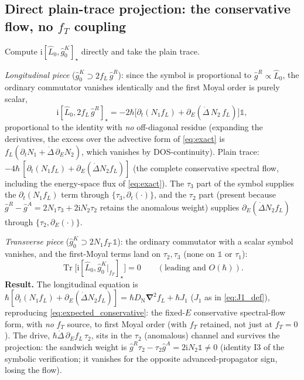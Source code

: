 \documentclass[
  aps,
  prb,
  preprint,
  superscriptaddress,
  longbibliography,
  nofootinbib
]{revtex4-2}
\newcommand{\ii}{\mathrm{i}}
\newcommand{\Tr}{\operatorname{Tr}}
\newcommand{\bnabla}{\boldsymbol{\nabla}}
\newcommand{\DOS}{N_1}
\newcommand{\DN}{D_{\mathrm{N}}}
\newcommand{\fL}{f_L}
\newcommand{\fT}{f_T}
\newcommand{\hatg}{\hat{g}}
\providecommand{\openone}{}\renewcommand{\openone}{\mathds{1}}
\begin{document}
\subsection{Direct plain-trace projection: the conservative flow, no
\texorpdfstring{$\fT$}{fT} coupling}
\label{sec:plain}

Compute $\ii[\hat L_0,\hatg_0^K]_\star$ directly and take the plain trace.

\emph{Longitudinal piece} ($\hatg_0^{K}\!\supset 2\fL\,\hatg^R$): since the
symbol is proportional to $\hatg^R\propto\hat L_0$, the ordinary commutator
vanishes identically and the first Moyal order is purely scalar,
\begin{equation}
  \ii[\hat L_0,2\fL\,\hatg^{R}]_\star
  =-2\hbar\bigl[\partial_t(\DOS\fL)+\partial_E(\dot\Delta\,N_2\,\fL)\bigr]
  \openone ,
  \label{eq:Lpiece}
\end{equation}
proportional to the identity with \emph{no} off-diagonal residue
(expanding the derivatives, the excess over the advective form of
\cref{eq:exact} is $\fL(\partial_t\DOS+\dot\Delta\,\partial_EN_2)$, which
vanishes by DOS-continuity). Plain trace:
$-4\hbar\,[\partial_t(\DOS\fL)+\partial_E(\dot\Delta N_2\fL)]$ (the
complete conservative spectral flow, including the energy-space flux of
\cref{eq:exact}). The $\tau_3$ part of the symbol supplies the
$\partial_t(\DOS\fL)$ term through
$\{\tau_3,\partial_t(\cdot)\}$, and the $\tau_2$ part (present because
$\hatg^R-\hatg^A=2\DOS\tau_3+2\ii N_2\tau_2$ retains the anomalous
weight) supplies $\partial_E(\dot\Delta N_2\fL)$ through
$\{\tau_2,\partial_E(\cdot)\}$.

\emph{Transverse piece} ($\hatg_0^{K}\!\supset 2\DOS\fT\,\openone$): the
ordinary commutator with a scalar symbol vanishes, and the first-Moyal
terms land on $\tau_2,\tau_3$ (none on $\openone$ or $\tau_1$):
\begin{equation}
  \Tr\bigl[\ii[\hat L_0,\hatg_0^{K}|_{\fT}]_\star\bigr]=0
  \qquad(\text{leading and }O(\hbar)).
  \label{eq:fTtrace}
\end{equation}
\textbf{Result.} The longitudinal equation is
$\hbar[\partial_t(\DOS\fL)+\partial_E(\dot\Delta N_2\fL)]
=\hbar\DN\bnabla^{2}\fL+\hbar J_1$ ($J_1$ as in \cref{eq:J1_def}),
reproducing \cref{eq:expected_conservative}:
the fixed-$E$ conservative spectral-flow form, with \emph{no} $\fT$ source,
to first Moyal order (with $\fT$ retained, not just at $\fT=0$). The drive,
$\hbar\dot\Delta\,\partial_E\fL\,\tau_2$, sits in the $\tau_2$
(anomalous) channel and survives the projection: the sandwich weight is
$\hatg^R\tau_2-\tau_2\hatg^A=2\ii N_2\openone\neq0$ (identity I3 of the
symbolic verification; it vanishes for the opposite advanced-propagator
sign, losing the flow).
\end{document}
